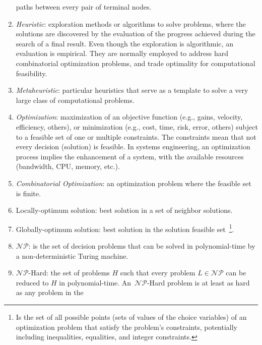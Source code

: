 \begin{enumerate}
paths between every pair of terminal nodes.
    \item \emph{Heuristic}: exploration methods or algorithms to solve problems, where the solutions are 
    discovered by the evaluation of the progress achieved during the search of a final result. Even though the 
    exploration is algorithmic, an evaluation is empirical. They are normally employed to address hard combinatorial optimization problems, and trade optimality for computational feasibility. 
    \item \emph{Metaheuristic}: particular heuristics that serve as a template to solve a very large class of computational problems. %
    \item \emph{Optimization}: maximization of an objective function (e.g., gains, velocity, efficiency, others),  or minimization (e.g., cost, time, risk, error, others) subject to a feasible set of one or multiple constraints. 
The constraints mean that not every decision (solution) is feasible. In systems engineering, an optimization process implies the enhancement of a system, with the available resources (bandwidth, CPU, memory, etc.). 
    \item \emph{Combinatorial Optimization}: an optimization problem where the feasible set is finite. 
    \item Locally-optimum solution: best solution in a set of neighbor solutions.
    \item Globally-optimum solution: best solution in the solution feasible set~\footnote{Is the set of all possible points (sets of values of the choice variables) of an optimization problem that satisfy the problem's constraints, potentially including inequalities, equalities, and integer constraints.}.
    \item $\mathcal{NP}$: is the set of decision problems that can be solved in polynomial-time by a non-deterministic Turing machine. 
    \item $\mathcal{NP}$-Hard: the set of problems $H$ such that every problem $L \in \mathcal{NP}$ can be 
    reduced to $H$ in polynomial-time. An~$\mathcal{NP}$-Hard problem is at least as hard as any problem in the 

\end{enumerate}
